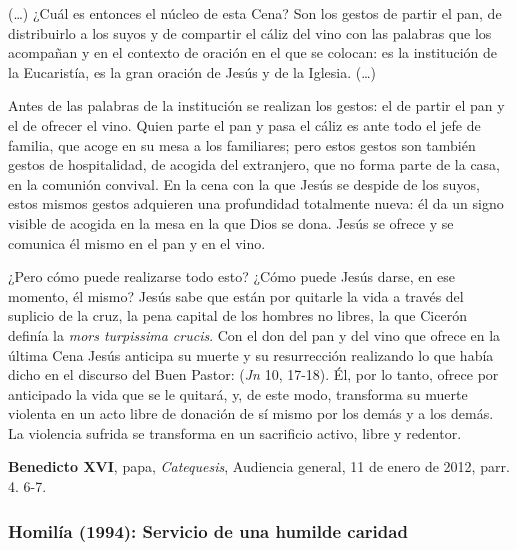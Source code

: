 \begin{patercite}
(\ldots) ¿Cuál es entonces el núcleo de esta Cena? Son los gestos de partir el pan, de distribuirlo a los suyos y de compartir el cáliz del vino con las palabras que los acompañan y en el contexto de oración en el que se colocan: es la institución de la Eucaristía, es la gran oración de Jesús y de la Iglesia. (\ldots)

Antes de las palabras de la institución se realizan los gestos: el de partir el pan y el de ofrecer el vino. Quien parte el pan y pasa el cáliz es ante todo el jefe de familia, que acoge en su mesa a los familiares; pero estos gestos son también gestos de hospitalidad, de acogida del extranjero, que no forma parte de la casa, en la comunión convival. En la cena con la que Jesús se despide de los suyos, estos mismos gestos adquieren una profundidad totalmente nueva: él da un signo visible de acogida en la mesa en la que Dios se dona. Jesús se ofrece y se comunica él mismo en el pan y en el vino.

¿Pero cómo puede realizarse todo esto? ¿Cómo puede Jesús darse, en ese momento, él mismo? Jesús sabe que están por quitarle la vida a través del suplicio de la cruz, la pena capital de los hombres no libres, la que Cicerón definía la \emph{mors turpissima crucis}. Con el don del pan y del vino que ofrece en la última Cena Jesús anticipa su muerte y su resurrección realizando lo que había dicho en el discurso del Buen Pastor:  (\emph{Jn} 10, 17-18). Él, por lo tanto, ofrece por anticipado la vida que se le quitará, y, de este modo, transforma su muerte violenta en un acto libre de donación de sí mismo por los demás y a los demás. La violencia sufrida se transforma en un sacrificio activo, libre y redentor.

\textbf{Benedicto XVI}, papa, \textit{Catequesis}, Audiencia general, 11 de enero de 2012, parr. 4. 6-7.

\end{patercite}
\newpage

\subsubsection{Homilía (1994): Servicio de una humilde caridad}


